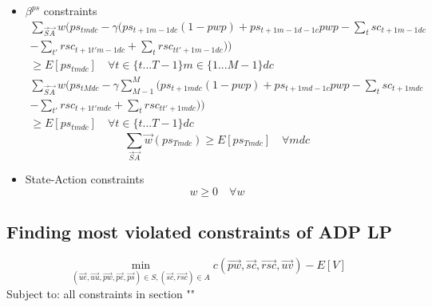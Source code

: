 \documentclass{article}
\begin{document}
\begin{itemize}
	\item $\beta^{ps}$ constraints
	\begin{multline}
		\sum_{\vec{S}\vec{A}}w \bigg( ps_{tmdc} - 
				\gamma \Big( ps_{t+1m-1dc}(1-pwp) + ps_{t+1m-1d-1c} pwp - \sum_{t} sc_{t+1m-1dc} \\ 
				 - \sum_{t'} rsc_{t+1t'm-1dc} + \sum_{t} rsc_{tt'+1m-1dc} \Big) \bigg) \\ 
				 \ge E[ps_{tmdc}] \quad \forall t \in \{t...T-1 \} m \in \{1 ... M-1 \} dc
	\end{multline}
	\begin{multline}
		\sum_{\vec{S}\vec{A}}w \bigg( ps_{tMdc} - 
				\gamma \sum_{M-1}^{M} \Big( ps_{t+1mdc}(1-pwp) + ps_{t+1md-1c} pwp - \sum_{t} sc_{t+1mdc} \\ 
				 - \sum_{t'} rsc_{t+1t'mdc} + \sum_{t} rsc_{tt'+1mdc} \Big) \bigg) \\ 
				 \ge E[ps_{tmdc}] \quad \forall t \in \{t...T-1 \} dc
	\end{multline}
	\begin{equation}
		\sum_{\vec{S}\vec{A}} \vec{w} (ps_{Tmdc}) \ge E[ps_{Tmdc}] \quad \forall mdc
	\end{equation}
	
	\item State-Action constraints
	\begin{equation}
		w \ge 0 \quad \forall w
	\end{equation}
\end{itemize}

\subsection{Finding most violated constraints of ADP LP}
\label{Pricing Problem}
\begin{equation}
	\min_{(\vec{ue}, \vec{uu}, \vec{pw}, \vec{pe}, \vec{ps}) \in S,  (\vec{sc}, \vec{rsc}) \in A } c(\vec{pw},\vec{sc},\vec{rsc},\vec{uv}) - E[V]
\end{equation}
Subject to:
all constraints in section ""
\end{document}
